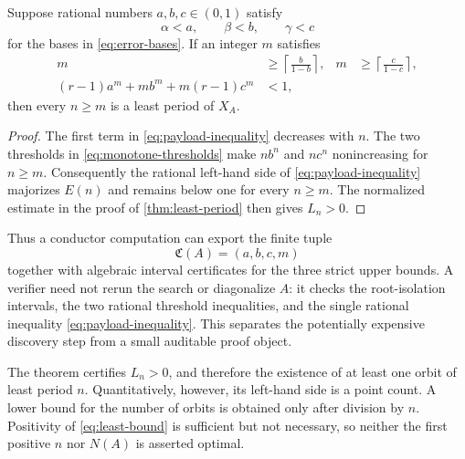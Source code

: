 \begin{proposition}
\label{prop:finite-payload}
Suppose rational numbers $a,b,c\in(0,1)$ satisfy
\[
 \alpha<a,\qquad \beta<b,\qquad \gamma<c
\]
for the bases in \cref{eq:error-bases}.  If an integer $m$ satisfies
\begin{align}
 m&\ge \left\lceil\frac{b}{1-b}\right\rceil,
 &
 m&\ge \left\lceil\frac{c}{1-c}\right\rceil,
 \label{eq:monotone-thresholds}\\
 (r-1)a^m+mb^m+m(r-1)c^m&<1,
 \label{eq:payload-inequality}
\end{align}
then every $n\ge m$ is a least period of $X_A$.
\end{proposition}

\begin{proof}
The first term in \cref{eq:payload-inequality} decreases with $n$.  The two
thresholds in \cref{eq:monotone-thresholds} make $nb^n$ and $nc^n$
nonincreasing for $n\ge m$.  Consequently the rational left-hand side of
\cref{eq:payload-inequality} majorizes $E(n)$ and remains below one for every
$n\ge m$.  The normalized estimate in the proof of
\cref{thm:least-period} then gives $L_n>0$.
\end{proof}

Thus a conductor computation can export the finite tuple
\[
 \mathfrak C(A)=(a,b,c,m)
\]
together with algebraic interval certificates for the three strict upper
bounds.  A verifier need not rerun the search or diagonalize $A$: it checks
the root-isolation intervals, the two rational threshold inequalities, and
the single rational inequality \cref{eq:payload-inequality}.  This separates
the potentially expensive discovery step from a small auditable proof
object.

\begin{remark}
\label{rem:points-orbits}
The theorem certifies $L_n>0$, and therefore the existence of at least one
orbit of least period $n$.  Quantitatively, however, its left-hand side is a
point count.  A lower bound for the number of orbits is obtained only after
division by $n$.  Positivity of \cref{eq:least-bound} is sufficient but not
necessary, so neither the first positive $n$ nor $N(A)$ is asserted optimal.
\end{remark}

